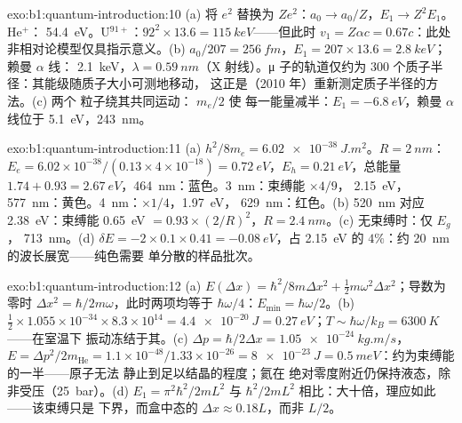 \begin{solution}{exo:b1:quantum-introduction:10}
(a) 将 $e^2$ 替换为 $Ze^2$：$a_0 \to a_0/Z$，$E_1 \to Z^2E_1$。He$^+$：
\qty{54.4}{eV}。U$^{91+}$：$92^2 \times 13.6 = \qty{115}{keV}$——但此时 $v_1 = Z\alpha c
= 0.67c$：此处非相对论模型仅具指示意义。(b) $a_0/207
= \qty{256}{fm}$，$E_1 = 207 \times 13.6 = \qty{2.8}{keV}$；赖曼 $\alpha$ 线：
\qty{2.1}{keV}，$\lambda = \qty{0.59}{nm}$（X 射线）。μ 子的轨道仅约为
$300$ 个质子半径：其能级随质子大小可测地移动，
这正是（2010 年）重新测定质子半径的方法。(c) 两个
粒子绕其共同运动： $m_e/2$ 使
每一能量减半：$E_1 = \qty{-6.8}{eV}$，赖曼 $\alpha$ 线位于 \qty{5.1}{eV}，\qty{243}{nm}。
\end{solution}

\begin{solution}{exo:b1:quantum-introduction:11}
(a) $h^2/8m_e = \qty{6.02e-38}{J.m^2}$。$R = \qty{2}{nm}$：$E_e = 6.02 \times 10^{-38}/
(0.13 \times 4 \times 10^{-18}) = \qty{0.72}{eV}$，$E_h = \qty{0.21}{eV}$，总能量 $1.74 +
0.93 = \qty{2.67}{eV}$，\qty{464}{nm}：蓝色。\qty{3}{nm}：束缚能 $\times4/9$，
\qty{2.15}{eV}，\qty{577}{nm}：黄色。\qty{4}{nm}：$\times1/4$，\qty{1.97}{eV}，
\qty{629}{nm}：红色。(b) \qty{520}{nm} 对应 \qty{2.38}{eV}：束缚能 \qty{0.65}{eV}
$= 0.93 \times (2/R)^2$，$R = \qty{2.4}{nm}$。(c) 无束缚时：仅 $E_g$，
\qty{713}{nm}。(d) $\delta E = -2 \times 0.1 \times 0.41 = \qty{-0.08}{eV}$，占
\qty{2.15}{eV} 的 $4\%$：约 \qty{20}{nm} 的波长展宽——纯色需要
单分散的样品批次。
\end{solution}

\begin{solution}{exo:b1:quantum-introduction:12}
(a) $E(\Delta x) = \hbar^2/8m\Delta x^2 + \tfrac12m\omega^2\Delta x^2$；导数为零时
$\Delta x^2 = \hbar/2m\omega$，此时两项均等于 $\hbar\omega/4$：$E_{\min} =
\hbar\omega/2$。(b) $\tfrac12 \times 1.055 \times 10^{-34} \times 8.3 \times 10^{14} = \qty{4.4e-20}{J}
= \qty{0.27}{eV}$；$T \sim \hbar\omega/k_B = \qty{6300}{K}$——在室温下
振动冻结于其。(c) $\Delta p = \hbar/2\Delta x =
\qty{1.05e-24}{kg.m/s}$，$E = \Delta p^2/2m_{\mathrm{He}} = 1.1 \times 10^{-48}/1.33 \times
10^{-26} = \qty{8e-23}{J} = \qty{0.5}{meV}$：约为束缚能的一半——原子无法
静止到足以结晶的程度；氦在
绝对零度附近仍保持液态，除非受压（\qty{25}{bar}）。(d) $E_1 = \pi^2\hbar^2/2mL^2$ 与
$\hbar^2/2mL^2$ 相比：大十倍，理应如此——该束缚只是
下界，而盒中态的 $\Delta x \approx 0.18L$，而非 $L/2$。
\end{solution}

